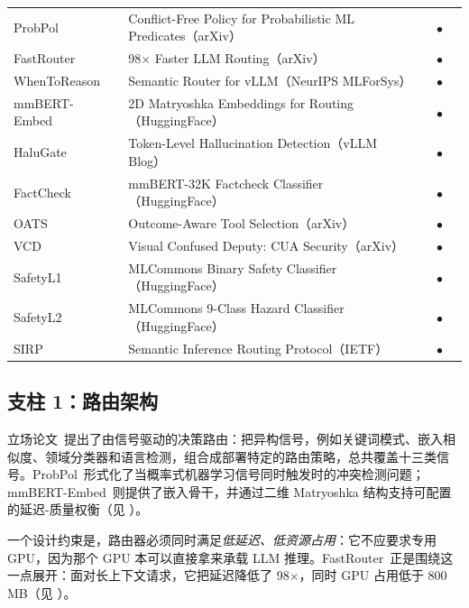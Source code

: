 \begin{table}[t]
\begin{tabularx}{\textwidth}{l X c c c}
ProbPol~\cite{probpol2026}
  & Conflict-Free Policy for Probabilistic ML Predicates（arXiv） &  & $\bullet$ &  \\
\rowcolor{lightgray}
FastRouter~\cite{fastrouter2026}
  & 98$\times$ Faster LLM Routing（arXiv） &  & $\bullet$ &  \\
WhenToReason~\cite{wang2025reason}
  & Semantic Router for vLLM（NeurIPS MLForSys） &  & $\bullet$ &  \\
\rowcolor{lightgray}
mmBERT-Embed~\cite{mmberted2025}
  & 2D Matryoshka Embeddings for Routing（HuggingFace） &  & $\bullet$ &  \\
HaluGate~\cite{halugate2025}
  & Token-Level Hallucination Detection（vLLM Blog） &  & $\bullet$ &  \\
\rowcolor{lightgray}
FactCheck~\cite{factcheck2026}
  & mmBERT-32K Factcheck Classifier（HuggingFace） &  & $\bullet$ &  \\
OATS~\cite{oats2026}
  & Outcome-Aware Tool Selection（arXiv） &  & $\bullet$ &  \\
\rowcolor{lightgray}
VCD~\cite{vcd2026}
  & Visual Confused Deputy: CUA Security（arXiv） &  & $\bullet$ &  \\
SafetyL1~\cite{safetyl1_2026}
  & MLCommons Binary Safety Classifier（HuggingFace） &  & $\bullet$ &  \\
\rowcolor{lightgray}
SafetyL2~\cite{safetyl2_2026}
  & MLCommons 9-Class Hazard Classifier（HuggingFace） &  & $\bullet$ &  \\
SIRP~\cite{sirp2025}
  & Semantic Inference Routing Protocol（IETF） &  & $\bullet$ &  \\
\bottomrule
\end{tabularx}
\end{table}

\subsection{支柱 1：路由架构}
\label{sec:foundation:routing}

\vsr{} 立场论文~\cite{vllmsr2026}提出了由信号驱动的决策路由：把异构信号，例如关键词模式、嵌入相似度、领域分类器和语言检测，组合成部署特定的路由策略，总共覆盖十三类信号。ProbPol~\cite{probpol2026}形式化了当概率式机器学习信号同时触发时的冲突检测问题；mmBERT-Embed~\cite{mmberted2025}则提供了嵌入骨干，并通过二维 Matryoshka 结构支持可配置的延迟-质量权衡（见 ）。

一个设计约束是，路由器必须同时满足\emph{低延迟、低资源占用}：它不应要求专用 GPU，因为那个 GPU 本可以直接拿来承载 LLM 推理。FastRouter~\cite{fastrouter2026}正是围绕这一点展开：面对长上下文请求，它把延迟降低了 98$\times$，同时 GPU 占用低于 800\,MB（见 ）。

